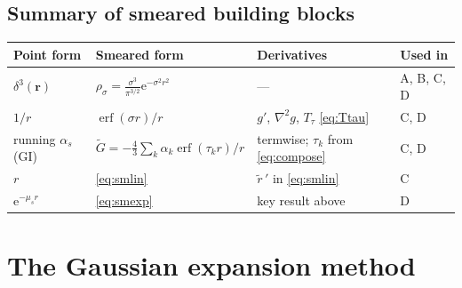 \documentclass[11pt,a4paper]{article}
\numberwithin{equation}{section}
\theoremstyle{definition}
\theoremstyle{plain}
\theoremstyle{remark}
\numberwithin{algorithm}{section}
\newcommand{\vr}{\bm r}
\newcommand{\as}{\alpha_s}
\newcommand{\ee}{\mathrm{e}}
\newcommand{\erf}{\operatorname{erf}}
\newcommand{\mus}{\mu_s}
\begin{document}
\subsection{Summary of smeared building blocks}
\begin{center}\small
\renewcommand{\arraystretch}{1.25}
\begin{tabular}{@{}>{\raggedright\arraybackslash}p{2.6cm}p{5.6cm}p{4.4cm}l@{}}
\toprule
Point form & Smeared form & Derivatives & Used in\\\midrule
$\delta^3(\vr)$ & $\rho_\sigma=\frac{\sigma^3}{\pi^{3/2}}\ee^{-\sigma^2r^2}$ & --- & A, B, C, D\\
$1/r$ & $\erf(\sigma r)/r$ & $g'$, $\nabla^2g$, $T_\tau$ \eqref{eq:Ttau} & C, D\\
running $\as$ (GI) & $\tilde G=-\frac43\sum_k\alpha_k\erf(\tau_kr)/r$ & termwise; $\tau_k$ from \eqref{eq:compose} & C, D\\
$r$ & \eqref{eq:smlin} & $\tilde r\,'$ in \eqref{eq:smlin} & C\\
$\ee^{-\mus r}$ & \eqref{eq:smexp} & key result above & D\\\bottomrule
\end{tabular}
\end{center}
\section{The Gaussian expansion method}\label{sec:gem}
\end{document}
